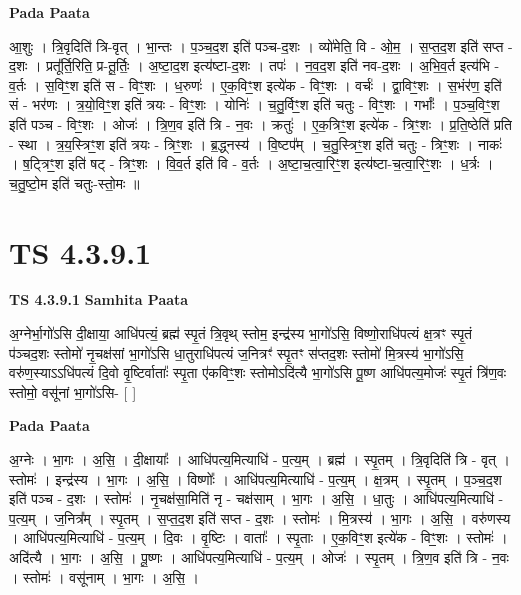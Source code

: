 \documentclass[17pt]{extarticle}
\begin{document}
\textbf{Pada Paata} \newline

आ॒शुः । त्रि॒वृदिति॑ त्रि-वृत् । भा॒न्तः । प॒ञ्च॒द॒श इति॑ पञ्च-द॒शः । व्यो॑मेति॒ वि - ओ॒म॒ । स॒प्त॒द॒श इति॑ सप्त - द॒शः । प्रतू᳚र्ति॒रिति॒ प्र-तू॒र्तिः॒ । अ॒ष्टा॒द॒श इत्य॑ष्टा-द॒शः । तपः॑ । न॒व॒द॒श इति॑ नव-द॒शः । अ॒भि॒व॒र्त इत्य॑भि - व॒र्तः । स॒विꣳ॒॒श इति॑ स - विꣳ॒॒शः । ध॒रुणः॑ । ए॒क॒विꣳ॒॒श इत्ये॑क - विꣳ॒॒शः । वर्चः॑ । द्वा॒विꣳ॒॒शः । स॒भंर॑ण॒ इति॑ सं - भर॑णः । त्र॒यो॒विꣳ॒॒श इति॑ त्रयः - विꣳ॒॒शः । योनिः॑ । च॒तु॒र्विꣳ॒॒श इति॑ चतुः - विꣳ॒॒शः । गर्भाः᳚ । प॒ञ्च॒विꣳ॒॒श इति॑ पञ्च - विꣳ॒॒शः । ओजः॑ । त्रि॒ण॒व इति॑ त्रि - न॒वः । क्रतुः॑ । ए॒क॒त्रिꣳ॒॒श इत्ये॑क - त्रिꣳ॒॒शः । प्र॒ति॒ष्ठेति॑ प्रति - स्था । त्र॒य॒स्त्रिꣳ॒॒श इति॑ त्रयः - त्रिꣳ॒॒शः । ब्र॒द्ध्नस्य॑ । वि॒ष्टप᳚म् । च॒तु॒स्त्रिꣳ॒॒श इति॑ चतुः - त्रिꣳ॒॒शः । नाकः॑ । ष॒ट्त्रिꣳ॒॒श इति॑ षट् - त्रिꣳ॒॒शः । वि॒व॒र्त इति॑ वि - व॒र्तः । अ॒ष्टा॒च॒त्वा॒रिꣳ॒॒श इत्य॑ष्टा-च॒त्वा॒रिꣳ॒॒शः । ध॒र्त्रः । च॒तु॒ष्टो॒म इति॑ चतुः-स्तो॒मः ॥  \newline




\section*{ TS 4.3.9.1 }

\textbf{TS 4.3.9.1 } \newline
\textbf{Samhita Paata} \newline

अ॒ग्नेर्भा॒गो॑ऽसि दी॒क्षाया॒ आधि॑पत्यं॒ ब्रह्म॑ स्पृ॒तं त्रि॒वृथ् स्तोम॒ इन्द्र॑स्य भा॒गो॑ऽसि॒ विष्णो॒राधि॑पत्यं क्ष॒त्रꣳ स्पृ॒तं प॑ञ्चद॒शः स्तोमो॑ नृ॒चक्ष॑सां भा॒गो॑ऽसि धा॒तुराधि॑पत्यं ज॒नित्रꣳ॑ स्पृ॒तꣳ स॑प्तद॒शः स्तोमो॑ मि॒त्रस्य॑ भा॒गो॑ऽसि॒ वरु॑ण॒स्याऽऽधि॑पत्यं दि॒वो वृ॒ष्टिर्वाताः᳚ स्पृ॒ता ए॑कविꣳ॒॒शः स्तोमोऽदि॑त्यै भा॒गो॑ऽसि पू॒ष्ण आधि॑पत्य॒मोजः॑ स्पृ॒तं त्रि॑ण॒वः स्तोमो॒ वसू॑नां भा॒गो॑ऽसि- [  ] \newline

\textbf{Pada Paata} \newline

अ॒ग्नेः । भा॒गः । अ॒सि॒ । दी॒क्षायाः᳚ । आधि॑पत्य॒मित्याधि॑ - प॒त्य॒म् । ब्रह्म॑ । स्पृ॒तम् । त्रि॒वृदिति॑ त्रि - वृत् । स्तोमः॑ । इन्द्र॑स्य । भा॒गः । अ॒सि॒ । विष्णोः᳚ । आधि॑पत्य॒मित्याधि॑ - प॒त्य॒म् । क्ष॒त्रम् । स्पृ॒तम् । प॒ञ्च॒द॒श इति॑ पञ्च - द॒शः । स्तोमः॑ । नृ॒चक्ष॑सा॒मिति॑ नृ - चक्ष॑साम् । भा॒गः । अ॒सि॒ । धा॒तुः । आधि॑पत्य॒मित्याधि॑ - प॒त्य॒म् । ज॒नित्र᳚म् । स्पृ॒तम् । स॒प्त॒द॒श इति॑ सप्त - द॒शः । स्तोमः॑ । मि॒त्रस्य॑ । भा॒गः । अ॒सि॒ । वरु॑णस्य । आधि॑पत्य॒मित्याधि॑ - प॒त्य॒म् । दि॒वः । वृ॒ष्टिः । वाताः᳚ । स्पृ॒ताः । ए॒क॒विꣳ॒॒श इत्ये॑क - विꣳ॒॒शः । स्तोमः॑ । अदि॑त्यै । भा॒गः । अ॒सि॒ । पू॒ष्णः । आधि॑पत्य॒मित्याधि॑ - प॒त्य॒म् । ओजः॑ । स्पृ॒तम् । त्रि॒ण॒व इति॑ त्रि - न॒वः । स्तोमः॑ । वसू॑नाम् । भा॒गः । अ॒सि॒ ।  \newline
\end{document}

